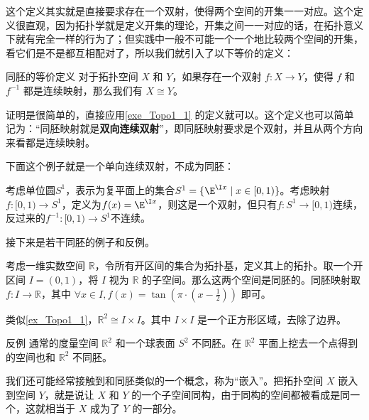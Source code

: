 这个定义其实就是直接要求存在一个双射，使得两个空间的开集一一对应。这个定义很直观，因为拓扑学就是定义开集的理论，开集之间一一对应的话，在拓扑意义下就有完全一样的行为了；但实践中一般不可能一个一个地比较两个空间的开集，看它们是不是都互相配对了，所以我们就引入了以下等价的定义：

\begin{theorem}{同胚的等价定义}\label{the_Topo1_1}
对于拓扑空间 $X$ 和 $Y$，如果存在一个双射 $f:X\rightarrow Y$，使得 $f$ 和 $f^{-1}$ 都是连续映射，那么我们有 $X\cong Y$。
\end{theorem}

证明是很简单的，直接应用\autoref{exe_Topo1_1} 的定义就可以。这个定义也可以简单记为：“同胚映射就是\textbf{双向连续双射}”，即同胚映射要求是个双射，并且从两个方向来看都是连续映射。

下面这个例子就是一个单向连续双射，不成为同胚：

\begin{example}{}

考虑单位圆$S^1$，表示为复平面上的集合$S^1=\{\E^{\I x}\mid x\in[0, 1)\}$。考虑映射$f:[0, 1)\to S^1$，定义为$f(x)=\E^{\I x}$，则这是一个双射，但只有$f:S^1\to[0, 1)$连续，反过来的$f^{-1}:[0, 1)\to S^1$不连续。

\end{example}

接下来是若干同胚的例子和反例。

\begin{example}{}\label{ex_Topo1_1}
考虑一维实数空间 $\mathbb{R}$，令所有开区间的集合为拓扑基，定义其上的拓扑。取一个开区间 $I=(0, 1)$，将 $I$ 视为 $\mathbb{R}$ 的子空间。那么这两个空间是同胚的。同胚映射取 $f:I\rightarrow\mathbb{R}$，其中 $\forall x\in I, f(x)=\tan{(\pi\cdot(x-\frac{1}{2}))}$ 即可。
\end{example}

\begin{example}{}\label{ex_Topo1_2}
类似\autoref{ex_Topo1_1}，$\mathbb{R}^2\cong I\times I$。其中 $I\times I$ 是一个正方形区域，去除了边界。
\end{example}

\begin{example}{反例}\label{ex_Topo1_3}
通常的度量空间 $\mathbb{R}^2$ 和一个球表面 $S^2$ 不同胚。在 $\mathbb{R}^2$ 平面上挖去一个点得到的空间也和 $\mathbb{R}^2$ 不同胚。
\end{example}

我们还可能经常接触到和同胚类似的一个概念，称为“嵌入”。把拓扑空间 $X$ 嵌入到空间 $Y$，就是说让 $X$ 和 $Y$ 的一个子空间同构，由于同构的空间都被看成是同一个，这就相当于 $X$ 成为了 $Y$ 的一部分。

